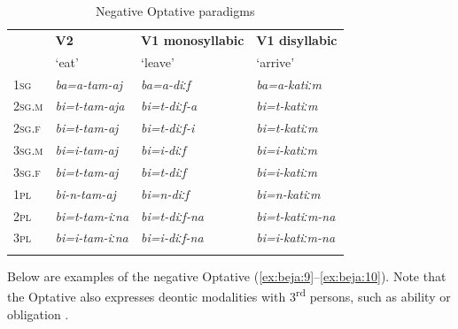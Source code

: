 \documentclass[output=paper,colorlinks,citecolor=brown]{langscibook}
\begin{document}
\begin{table}
\begin{tabularx}{\textwidth}{lXXl}
\lsptoprule
& {\bfseries V2} & {\bfseries V1 monosyllabic} & {\bfseries V1 disyllabic}\\
& { `eat'} & { `leave'} & { `arrive'}\\
\midrule 
{\scshape 1sg} & \textit{ba=a-tam-aj} & \textit{ba=a-diːf} & \textit{ba=a-katiːm}\\
{\scshape 2sg.m} & \textit{bi=t-tam-aja} & \textit{bi=t-diːf-a} & \textit{bi=t-katiːm}\\
{\scshape 2sg.f} & \textit{bi=t-tam-aj} & \textit{bi=t-diːf-i} & \textit{bi=t-katiːm}\\
{\scshape 3sg.m} & \textit{bi=i-tam-aj} & \textit{bi=i-diːf} & \textit{bi=i-katiːm}\\
{\scshape 3sg.f} & \textit{bi=t-tam-aj} & \textit{bi=t-diːf} & \textit{bi=i-katiːm}\\
{\scshape 1pl} & \textit{bi-n-tam-aj} & \textit{bi=n-diːf} & \textit{bi=n-katiːm}\\
{\scshape 2pl} & \textit{bi=t-tam-iːna} & \textit{bi=t-diːf-na} & \textit{bi=t-katiːm-na}\\
{\scshape 3pl} & \textit{bi=i-tam-iːna} & \textit{bi=i-diːf-na} & \textit{bi=i-katiːm-na}\\
\lspbottomrule
\end{tabularx}
\itshape
\caption{Negative Optative paradigms}
\label{tab:beja:3}
\end{table}

Below are examples of the negative Optative (\ref{ex:beja:9}--\ref{ex:beja:10}). Note that the Optative also expresses deontic modalities with 3\textsuperscript{rd} persons, such as ability  or obligation .


\end{document}

